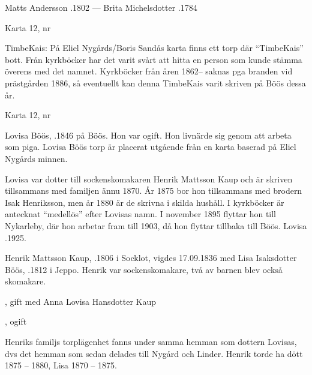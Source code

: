 Matts Andersson .1802  ---  Brita Michelsdotter .1784




Karta 12,   nr 

TimbeKais:	På Eliel Nygårds/Boris Sandås karta finns ett torp där ``TimbeKais'' bott. Från kyrkböcker har det varit svårt att hitta en person som kunde stämma överens med det namnet. Kyrkböcker från åren 1862-- saknas pga branden vid prästgården 1886, så eventuellt kan denna TimbeKais varit skriven på Böös dessa år.


Karta 12,   nr 

Lovisa Böös, .1846 på Böös. Hon var ogift. Hon livnärde sig genom att arbeta som piga. Lovisa Böös torp är placerat utgående från en karta baserad på Eliel Nygårds minnen.

Lovisa var dotter till sockenskomakaren Henrik Mattsson Kaup och är skriven tillsammans med familjen ännu 1870. År 1875 bor hon tillsammans med brodern Isak Henriksson, men år 1880 är de skrivna i skilda hushåll. I kyrkböcker är antecknat ``medellös'' efter Lovisas namn. I november 1895 flyttar hon till Nykarleby, där hon arbetar fram till 1903, då hon flyttar tillbaka till Böös. Lovisa .1925.


Henrik Mattsson Kaup, .1806 i Socklot, vigdes 17.09.1836 med Lisa Isaksdotter Böös, .1812 i Jeppo. Henrik var sockenskomakare, två av barnen blev också skomakare.
\begin{jhchildren}
  \item {}
  \item {}
  \item {}, gift med Anna Lovisa Hansdotter Kaup
  \item {}, ogift
  \item {}
  \item {}
  \item {}
  \item {}
\end{jhchildren}
Henriks familjs torplägenhet fanns under samma hemman som dottern Lovisas, dvs det hemman som sedan delades till Nygård och Linder. Henrik torde ha dött 1875 – 1880, Lisa 1870 – 1875.


